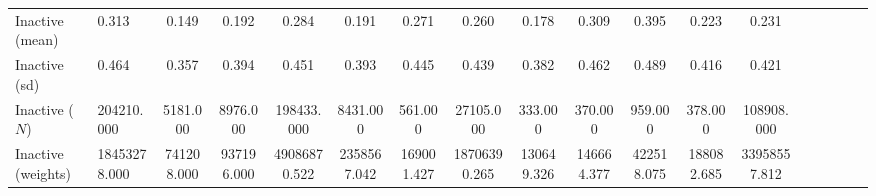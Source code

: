 \begin{landscape}
\begin{table}[htbp]
\begin{tabular}{llcccccccccccccccc}
Inactive (mean) & 0.313 & 0.149 & 0.192 & 0.284 & 0.191 & 0.271 & 0.260 & 0.178 & 0.309 & 0.395 & 0.223 & 0.231 \\
Inactive (sd) & 0.464 & 0.357 & 0.394 & 0.451 & 0.393 & 0.445 & 0.439 & 0.382 & 0.462 & 0.489 & 0.416 & 0.421 \\
Inactive ($N$) & 204210.000 & 5181.000 & 8976.000 & 198433.000 & 8431.000 & 561.000 & 27105.000 & 333.000 & 370.000 & 959.000 & 378.000 & 108908.000 \\
Inactive (weights) & 18453278.000 & 741208.000 & 937196.000 & 49086870.522 & 2358567.042 & 169001.427 & 18706390.265 & 130649.326 & 146664.377 & 422518.075 & 188082.685 & 33958557.812 \\
\bottomrule
\end{tabular}

\end{table}
\end{landscape}
